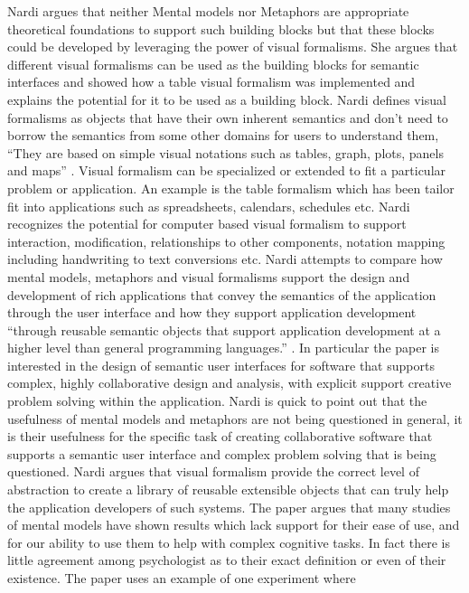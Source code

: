 \documentclass{sig-alternate}
\begin{document}
Nardi argues that neither Mental models nor Metaphors are appropriate
theoretical foundations to support such  building blocks but that these blocks
could be developed by leveraging the power of visual formalisms. She argues that
different visual formalisms can be used as the building blocks for semantic
interfaces and showed how a table visual formalism was implemented and explains
the potential for it to be used as a building block. Nardi defines visual
formalisms as objects that have their own inherent semantics and don't need to
borrow the semantics from some other domains for users to understand them,
``They are based on simple visual notations such as tables, graph, plots, panels
and maps'' \cite{Nardi:BeyondModels}. Visual formalism can be specialized or
extended to fit a particular problem or application. An example is the table
formalism which has been tailor fit into applications such as spreadsheets,
calendars, schedules etc.  Nardi recognizes the potential for computer based
visual formalism to support interaction, modification, relationships  to other
components, notation mapping including handwriting to text conversions etc.
Nardi attempts to compare how mental models, metaphors and visual formalisms
support the design and development of rich applications that convey the
semantics of the application through the user interface and how they support
application development ``through reusable semantic objects that support
application development at a higher level than general programming languages.''
\cite{Nardi:BeyondModels}. In particular the paper is interested in the design
of semantic user interfaces for software that supports complex, highly
collaborative design and analysis, with explicit support creative problem
solving within the application. Nardi is quick to point out that the usefulness
of mental models and metaphors are not being questioned in general, it is their
usefulness for the specific task of creating collaborative software that
supports a semantic user interface and complex problem solving that is being
questioned. Nardi argues that visual formalism provide the correct level of
abstraction to create a library of reusable extensible objects that can truly
help the application developers of such systems. The paper argues that many
studies of mental models have shown results which lack support for their ease of
use, and for our ability to use them to help with complex cognitive tasks. In
fact there is little agreement among psychologist as to their exact definition
or even of their existence. The paper uses an example of one experiment where
\end{document}
